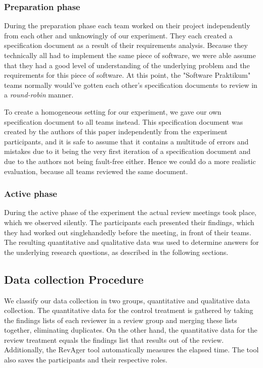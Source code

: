 \subsubsection{Preparation phase}
During the preparation phase each team worked on their project independently from each other and unknowingly of our experiment.
They each created a specification document as a result of their requirements analysis.
Because they technically all had to implement the same piece of software, we were able assume that they had a good level of understanding of the underlying problem and the requirements for this piece of software.
At this point, the "Software Praktikum" teams normally would've gotten each other's specification documents to review in a \textit{round-robin} manner.

To create a homogeneous setting for our experiment, we gave our own specification document to all teams instead.
This specification document was created by the authors of this paper independently from the experiment participants, and it is safe to assume that it contains a multitude of errors and mistakes due to it being the very first iteration of a specification document and due to the authors not being fault-free either.
Hence we could do a more realistic evaluation, because all teams reviewed the same document.
\subsubsection{Active phase}
During the active phase of the experiment the actual review meetings took place, which we observed silently.
The participants each presented their findings, which they had worked out singlehandedly before the meeting, in front of their teams.
The resulting quantitative and qualitative data was used to determine answers for the underlying research questions, as described in the following sections.
\subsection{Data collection Procedure}

We classify our data collection in two groups, quantitative and qualitative data collection.
The quantitative data for the control treatment is gathered by taking the findings lists of each reviewer in a review group and merging these lists together, eliminating duplicates.
On the other hand, the quantitative data for the review treatment equals the findings list that results out of the review. Additionally, the RevAger tool automatically measures the elapsed time.
The tool also saves the participants and their respective roles.

